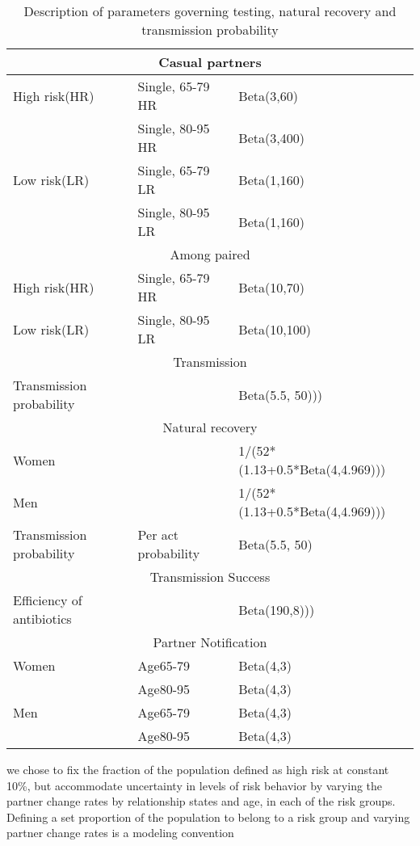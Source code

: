 \documentclass{article}
\begin{document}
\begin{normalsize}
\begin{table}[H]
\begin{tabular}{ |p{5cm}|p{7cm}|p{5cm}| }
			\multicolumn{3}{|c|}{Casual partners} \\
			\hline
			High risk(HR)& Single, 65-79 HR	& Beta(3,60)\\
 						 & Single, 80-95 HR	& Beta(3,400)\\
			Low risk(LR)	 & Single, 65-79 LR	& Beta(1,160) \\
 						 & Single, 80-95 LR	&Beta(1,160)\\
 			\hline
 			\multicolumn{3}{|c|}{Among paired} \\
 			\hline
			High risk(HR)& Single, 65-79 HR	& Beta(10,70)\\
			Low risk(LR) & Single, 80-95 LR	& Beta(10,100)\\
			\hline
			
		\multicolumn{3}{|c|}{Transmission} \\
			\hline
			Transmission probability & & Beta(5.5, 50)))\\
    		\hline
    		
		\multicolumn{3}{|c|}{Natural recovery} \\
			\hline
			Women & & 1/(52*(1.13+0.5*Beta(4,4.969)))\\
			Men & & 1/(52*(1.13+0.5*Beta(4,4.969)))\\
			Transmission probability	 & Per act probability	& Beta(5.5, 50)\\
    		\hline
    	
    	\multicolumn{3}{|c|}{Transmission Success} \\
    	    \hline
			Efficiency of antibiotics & & Beta(190,8)))\\
    		\hline

    	\multicolumn{3}{|c|}{Partner Notification} \\
    	    \hline
			Women&Age65-79&Beta(4,3)\\
			&Age80-95&Beta(4,3)
			\\
			Men&Age65-79&Beta(4,3)\\
			&Age80-95&Beta(4,3)\\
    		\hline
    
    		   		
    		
    		
    		
    	\end{tabular}
    	\label{tab:parameter}
    	\caption{Description of parameters governing testing, natural recovery and transmission probability}
   \end{table}
   
   	we chose to fix the fraction of the population defined as high risk at constant 10\%, but accommodate uncertainty in levels of risk behavior by varying the partner change rates by relationship states and age, in each of the risk groups. Defining a set proportion of the population to belong to a risk group and varying partner change rates is a modeling convention

    

	


\end{normalsize}
  
\end{document}
